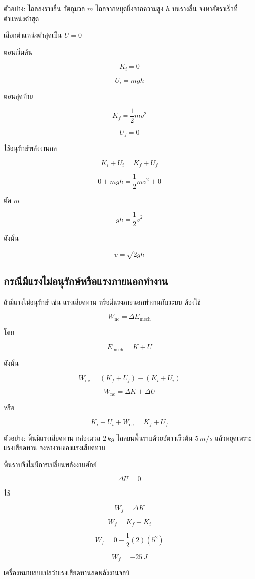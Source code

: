 \begin{examplebox}{ตัวอย่าง: ไถลลงรางลื่น}
วัตถุมวล $m$ ไถลจากหยุดนิ่งจากความสูง $h$ บนรางลื่น จงหาอัตราเร็วที่ตำแหน่งต่ำสุด

เลือกตำแหน่งต่ำสุดเป็น $U=0$

ตอนเริ่มต้น

\[
K_i=0
\]

\[
U_i=mgh
\]

ตอนสุดท้าย

\[
K_f=\frac{1}{2}mv^2
\]

\[
U_f=0
\]

ใช้อนุรักษ์พลังงานกล

\[
K_i+U_i=K_f+U_f
\]

\[
0+mgh=\frac{1}{2}mv^2+0
\]

ตัด $m$

\[
gh=\frac{1}{2}v^2
\]

ดังนั้น

\[
v=\sqrt{2gh}
\]
\end{examplebox}

\subsection{กรณีมีแรงไม่อนุรักษ์หรือแรงภายนอกทำงาน}

ถ้ามีแรงไม่อนุรักษ์ เช่น แรงเสียดทาน หรือมีแรงภายนอกทำงานกับระบบ ต้องใช้

\[
W_{\text{nc}}=\Delta E_{\text{mech}}
\]

โดย

\[
E_{\text{mech}}=K+U
\]

ดังนั้น

\[
W_{\text{nc}}=(K_f+U_f)-(K_i+U_i)
\]

\begin{tcolorbox}[title=พลังงานเมื่อมีแรงไม่อนุรักษ์]
\[
W_{\text{nc}}=\Delta K+\Delta U
\]

หรือ

\[
K_i+U_i+W_{\text{nc}}=K_f+U_f
\]
\end{tcolorbox}

\begin{examplebox}{ตัวอย่าง: พื้นมีแรงเสียดทาน}
กล่องมวล $2\,\si{kg}$ ไถลบนพื้นราบด้วยอัตราเร็วต้น $5\,\si{m/s}$ แล้วหยุดเพราะแรงเสียดทาน จงหางานของแรงเสียดทาน

พื้นราบจึงไม่มีการเปลี่ยนพลังงานศักย์

\[
\Delta U=0
\]

ใช้

\[
W_f=\Delta K
\]

\[
W_f=K_f-K_i
\]

\[
W_f=0-\frac{1}{2}(2)(5^2)
\]

\[
W_f=-25\,\si{J}
\]

เครื่องหมายลบแปลว่าแรงเสียดทานลดพลังงานจลน์
\end{examplebox}

